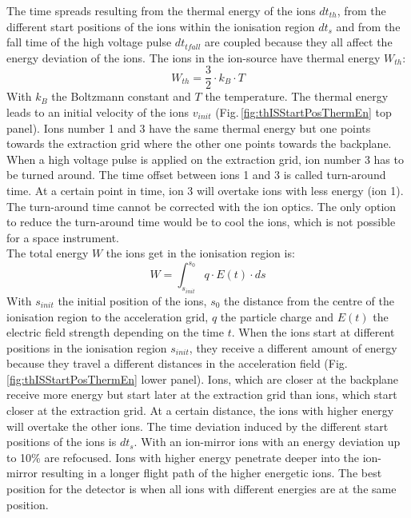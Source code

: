 	The time spreads resulting from the thermal energy of the ions $dt_{th}$, from the different start positions of the ions within the ionisation region $dt_s$ and from the fall time of the high voltage pulse $dt_{tfall}$ are coupled because they all affect the energy deviation of the ions.
	The ions in the ion-source have thermal energy $W_{th}$:
	\begin{equation}
		W_{th} = \frac{3}{2}\cdot k_B \cdot T
	\end{equation}
	With $k_B$ the Boltzmann constant and $T$ the temperature. The thermal energy leads to an initial velocity of the ions $v_{init}$ (Fig.\,\ref{fig:thISStartPosThermEn} top panel). Ions number 1 and 3 have the same thermal energy but one points towards the extraction grid where the other one points towards the backplane. When a high voltage pulse is applied on the extraction grid, ion number 3 has to be turned around. The time offset between ions 1 and 3 is called turn-around time. At a certain point in time, ion 3 will overtake ions with less energy (ion 1). The turn-around time cannot be corrected with the ion optics. The only option to reduce the turn-around time would be to cool the ions, which is not possible for a space instrument.\\
	The total energy $W$ the ions get in the ionisation region is:
	\begin{equation}
		W = \int_{s_{init}}^{s_0} q\cdot E(t)\cdot ds
		\label{eq:WionsISposEt}
	\end{equation}
	With $s_{init}$ the initial position of the ions, $s_0$ the distance from the centre of the ionisation region to the acceleration grid, $q$ the particle charge and $E(t)$ the electric field strength depending on the time $t$. When the ions start at different positions in the ionisation region $s_{init}$, they receive a different amount of energy because they travel a different distances in the acceleration field (Fig.\,\ref{fig:thISStartPosThermEn} lower panel). Ions, which are closer at the backplane receive more energy but start later at the extraction grid than ions, which start closer at the extraction grid. At a certain distance, the ions with higher energy will overtake the other ions. The time deviation induced by the different start positions of the ions is $dt_{s}$. With an ion-mirror ions with an energy deviation up to 10\% are refocused. Ions with higher energy penetrate deeper into the ion-mirror resulting in a longer flight path of the higher energetic ions. The best position for the detector is when all ions with different energies are at the same position.\\
